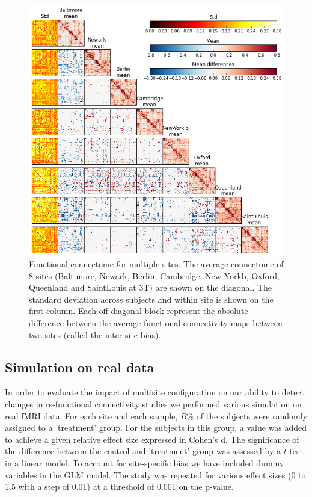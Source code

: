 \documentclass[authoryear]{elsarticle}
\begin{document}
\begin{figure}[tbp]
\begin{center}
\includegraphics[width=\linewidth]{../figures/connectome_multisite.png}
\end{center}
\caption[Connectome variability across sites]{
Functional connectome for multiple sites. The average connectome of 8 sites (Baltimore, Newark, Berlin, Cambridge, New-Yorkb, Oxford, Queenland and SaintLouis at 3T) are shown on the diagonal. The standard deviation across subjects and within site is shown on the first column. Each off-diagonal block represent the absolute difference between the average functional connectivity maps between two sites (called the inter-site bias).
}
\label{fig_connectome_variability}
\end{figure}

\subsection{Simulation on real data}

In order to evaluate the impact of multisite configuration on our ability to detect changes in rs-functional connectivity studies we performed various simulation on real fMRI data. For each site and each sample, $B\%$ of the subjects were randomly assigned to a 'treatment' group. For the subjects in this group, a value was added to achieve a given relative effect size expressed in Cohen's d. The significance of the difference between the control and 'treatment' group was assessed by a $t$-test in a linear model. To account for site-specific bias we have included dummy variables in the GLM model. The study was repeated for various effect sizes (0 to 1.5 with a step of 0.01) at a threshold of 0.001 on the p-value.
\end{document}
